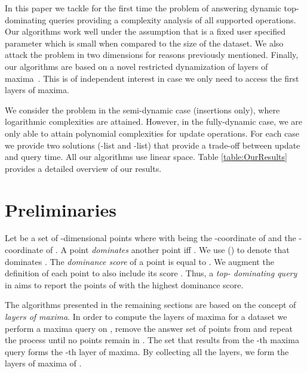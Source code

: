 \documentclass{llncs}
\begin{document}
\vspace{-0.5cm}
\noindent In this paper we tackle for the first time the problem of answering dynamic top- dominating queries providing a complexity analysis of all supported operations. Our algorithms work well under the assumption that  is a fixed user specified parameter which is small when compared to the size  of the dataset. We also attack the problem in two dimensions for reasons previously mentioned. Finally, our algorithms are based on a novel restricted dynamization of layers of maxima~\cite{BlunckVAlgorithmica10}. This is of independent interest in case we only need to access the first  layers of maxima.

We consider the problem in the semi-dynamic case (insertions only), where logarithmic  complexities are attained. However, in the fully-dynamic case, we are only able to attain polynomial complexities for update operations. For each case we provide two solutions (-list and -list) that provide a trade-off between update and query time. All our algorithms use linear space. Table \ref{table:OurResults} provides a detailed  overview of our results.




\section{Preliminaries} \label{section:Preliminaries}

Let  be a set of  -dimensional points  where  with  being the -coordinate of  and  the -coordinate of . A point  \emph{dominates} another point  iff . We use () to denote that  dominates . The \emph{dominance score} of a point  is equal to . We augment the definition of each point  to also include its score .
Thus, a \emph{top- dominating query} in  aims to report the  points of  with the highest dominance score.

The algorithms presented in the remaining sections are based on the concept of \emph{layers of maxima}. In order to compute the layers of maxima for a dataset  we perform a maxima query on , remove the answer set of points from  and repeat the process until no points remain in . The set that results from the -th maxima query forms the -th layer of maxima. By collecting all the layers, we form the layers of maxima of .
\end{document}
